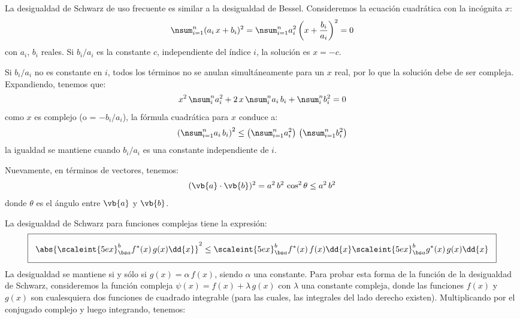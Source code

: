 La desigualdad de Schwarz de uso frecuente es similar a la desigualdad de Bessel. Consideremos la ecuación cuadrática con la incógnita $x$:
\begin{align}
\nsum_{i=1}^{n} (a_{i} \, x + b_{i})^{2} = \nsum_{i=1}^{n} a_{i}^{2} \left( x + \dfrac{b_{i}}{a_{i}} \right)^{2} = 0
\label{eq:ecuacion_10_74}
\end{align}
con $a_{i}$, $b_{i}$ reales. Si $b_{i}/a_{i}$ es la constante $c$, independiente del índice $i$, la solución es $x= - c$. 
\par
Si $b_{i}/a_{i}$ no es constante en $i$, todos los términos no se anulan simultáneamente para un $x$ real, por lo que la solución debe de ser compleja. Expandiendo, tenemos que:
\begin{align}
x^{2} \, \nsum_{i}^{n} a_{i}^{2} + 2 \, x \, \nsum_{i}^{n} a_{i} \, b_{i} + \nsum_{i}^{n} b_{i}^{2} = 0
\label{eq:ecuacion_10_75}
\end{align}
como $x$ es complejo (o = $-b_{i}/a_{i}$), la fórmula cuadrática para $x$ conduce a: 
\begin{align}
\left( \nsum_{i=1}^{n} a_{i} \, b_{i} \right)^{2} \leq \left( \nsum_{i=1}^{n} a_{i}^{2} \right) \, \left( \nsum_{i=1}^{n} b_{i}^{2} \right)
\label{eq:ecuacion_10_76}
\end{align}
la igualdad se mantiene cuando $b_{i}/a_{i}$ es una constante independiente de $i$.
\par
Nuevamente, en términos de vectores, tenemos:
\begin{align}
( \vb{a} \cdot \vb{b} )^{2} =  a^{2} \, b^{2} \, \cos^{2} \theta \leq a^{2} \, b^{2}
\label{eq:ecuacion_10_77}
\end{align}
donde $\theta$ es el ángulo entre $\vb{a}$ y $\vb{b}$.
\par
La desigualdad de Schwarz para funciones complejas tiene la expresión:
\begin{align}
\setlength{\fboxsep}{3\fboxsep}\boxed{
\abs{ \scaleint{5ex}_{\bs a}^{b} f^{*} (x) \, g (x) \dd{x} }^{2} \leq \scaleint{5ex}_{\bs a}^{b} f^{*} (x) \, f (x) \dd{x} \scaleint{5ex}_{\bs a}^{b} g^{*} (x) \, g (x) \dd{x}}
\label{eq:ecuacion_10_78}
\end{align}
La desigualdad se mantiene si y sólo si $g (x) = \alpha \, f (x)$, siendo $\alpha$ una constante. Para probar esta forma de la función de la desigualdad de Schwarz, consideremos la función compleja $\psi (x) = f(x) + \lambda \, g (x)$ con $\lambda$ una constante compleja, donde las funciones $f (x)$ y $g (x)$ son cualesquiera dos funciones de cuadrado integrable (para las cuales, las integrales del lado derecho existen). Multiplicando por el conjugado complejo y luego integrando, tenemos:
